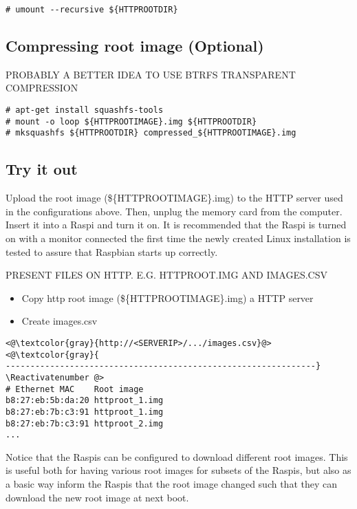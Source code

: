 \begin{lstlisting}[]
# umount --recursive ${HTTPROOTDIR}
\end{lstlisting}
\FloatBarrier
\vspace{-5mm}


\subsection{Compressing root image (Optional)}

PROBABLY A BETTER IDEA TO USE BTRFS TRANSPARENT COMPRESSION

\begin{lstlisting}[]
# apt-get install squashfs-tools
# mount -o loop ${HTTPROOTIMAGE}.img ${HTTPROOTDIR}
# mksquashfs ${HTTPROOTDIR} compressed_${HTTPROOTIMAGE}.img
\end{lstlisting}
\FloatBarrier
\vspace{-5mm}

\subsection{Try it out}

Upload the root image (\$\{HTTPROOTIMAGE\}.img) to the HTTP server used in the
configurations above. Then, unplug the memory card from the computer.
Insert it into a \ac{Raspi} and
turn it on. It is recommended that the \ac{Raspi} is turned on with a monitor
connected the first time the newly created Linux installation is tested to
assure that Raspbian starts up correctly.


PRESENT FILES ON HTTP. E.G. HTTPROOT.IMG AND IMAGES.CSV


\begin{itemize}
    \item Copy http root image (\$\{HTTPROOTIMAGE\}.img) a HTTP server
    \item Create images.csv
\end{itemize}


\Suppressnumber\begin{lstlisting}[]
<@\textcolor{gray}{http://<SERVERIP>/.../images.csv}@>
<@\textcolor{gray}{
---------------------------------------------------------------}
\Reactivatenumber @>
# Ethernet MAC    Root image
b8:27:eb:5b:da:20 httproot_1.img
b8:27:eb:7b:c3:91 httproot_1.img
b8:27:eb:7b:c3:91 httproot_2.img
...
\end{lstlisting}
\FloatBarrier
\vspace{-5mm}

Notice that the \ac{Raspi}s can be configured to download different root images.
This is useful both for having various root images for subsets of the \ac{Raspi}s,
but also as a basic way inform the \ac{Raspi}s that the root image changed such
that they can download the new root image at next boot.

